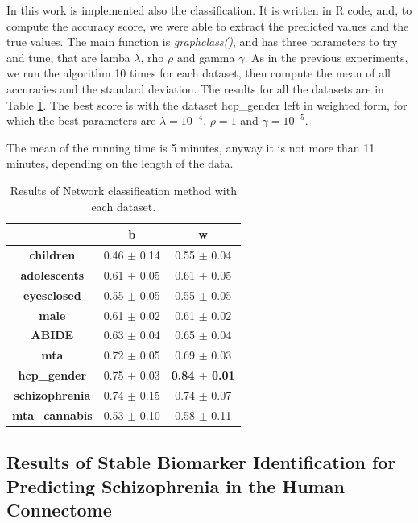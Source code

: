 In this work is implemented also the classification. It is written in R code, and, to compute the accuracy score, we were able to extract the predicted values and the true values. The main function is \textit{graphclass()}, and has three parameters to try and tune, that are lamba $\lambda$, rho $\rho$ and gamma $\gamma$. As in the previous experiments, we run the algorithm 10 times for each dataset, then compute the mean of all accuracies and the standard deviation. The results for all the datasets are in Table \ref{tab:graphclass}. The best score is with the dataset hcp\_gender left in weighted form, for which the best parameters are $\lambda = 10^{-4} $, $\rho = 1$ and $\gamma = 10^{-5}$. 
\vspace{0.5cm}

The mean of the running time is 5 minutes, anyway it is not more than 11 minutes, depending on the length of the data. 

\begin{table}
	\centering
	\begin{tabular}{c|l|c} 
		\toprule
		& \multicolumn{1}{c|}{b} & w                \\ 
		\midrule
		\textbf{children}      & 0.46 $\pm$ 0.14        & 0.55 $\pm$ 0.04  \\
		\textbf{adolescents}   & 0.61 $\pm$ 0.05        & 0.61 $\pm$ 0.05  \\
		\textbf{eyesclosed}    & 0.55 $\pm$ 0.05        & 0.55 $\pm$ 0.05  \\
		\textbf{male}          & 0.61 $\pm$ 0.02        & 0.61 $\pm$ 0.02  \\
		\textbf{ABIDE}         & 0.63 $\pm$ 0.04        & 0.65 $\pm$ 0.04  \\
		\textbf{mta}           & 0.72 $\pm$ 0.05        & 0.69 $\pm$ 0.03  \\
		\textbf{hcp\_gender}   & 0.75 $\pm$ 0.03        & \textbf{0.84 $\pm$ 0.01}  \\
		\textbf{schizophrenia} & 0.74 $\pm$ 0.15        & 0.74 $\pm$ 0.07  \\
		\textbf{mta\_cannabis} & 0.53 $\pm$ 0.10        & 0.58 $\pm$ 0.11 
	\end{tabular}
\caption{Results of Network classification method with each dataset.}
\label{tab:graphclass}
\end{table}

\subsection{Results of Stable Biomarker Identification for Predicting Schizophrenia in the Human Connectome}

